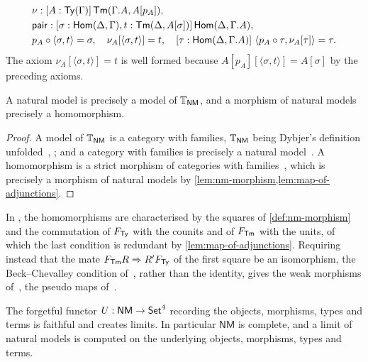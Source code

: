 \begin{definition}
\begin{align*}
        &\nu : [A : \mathsf{Ty}(\Gamma)]\,\mathsf{Tm}(\Gamma.A, A[p_A]),\\
        &\mathsf{pair} : [\sigma : \mathsf{Hom}(\Delta, \Gamma), t : \mathsf{Tm}(\Delta, A[\sigma])]\,\mathsf{Hom}(\Delta, \Gamma.A),\\
        &p_A \circ \langle \sigma, t \rangle = \sigma, \quad \nu_A[\langle \sigma, t \rangle] = t, \quad [\tau : \mathsf{Hom}(\Delta, \Gamma.A)]\ \langle p_A \circ \tau, \nu_A[\tau] \rangle = \tau.
    \end{align*}
    The axiom $\nu_A[\langle \sigma, t \rangle] = t$ is well formed because $A[p_A][\langle \sigma, t \rangle] = A[\sigma]$ by the preceding axioms.
\end{definition}

\begin{lemma}\label{lem:nm-models}
    A natural model is precisely a model of $\mathbb{T}_{\mathsf{NM}}$, and a morphism of natural models precisely a homomorphism.
\end{lemma}

\begin{proof}
    A model of $\mathbb{T}_{\mathsf{NM}}$ is a category with families, $\mathbb{T}_{\mathsf{NM}}$ being Dybjer's definition unfolded~\cite[\S2.2]{Dybjer1996}, \cite[Rem.~2]{CastellanClairambaultDybjer2021}; and a category with families is precisely a natural model~\cite[Prop.~2]{Awodey2018}. A homomorphism is a strict morphism of categories with families~\cite[Def.~2]{Dybjer1996}, which is precisely a morphism of natural models by \cref{lem:nm-morphism,lem:map-of-adjunctions}.
\end{proof}

In \cite[Thm.~2.3.2]{Newstead2018}, the homomorphisms are characterised by the squares of \cref{def:nm-morphism} and the commutation of $F_{\mathsf{Ty}}$ with the counits and of $F_{\mathsf{Tm}}$ with the units, of which the last condition is redundant by \cref{lem:map-of-adjunctions}. Requiring instead that the mate $F_{\mathsf{Tm}} R \Rightarrow R' F_{\mathsf{Ty}}$ of the first square be an isomorphism, the Beck--Chevalley condition of~\cite[Def.~3.14]{Uemura2023}, rather than the identity, gives the weak morphisms of~\cite[Def.~2.3.9]{Newstead2018}, the pseudo maps of~\cite[Def.~42]{AhrensLumsdaineNorth2024}.

\begin{lemma}\label{lem:limits}
    The forgetful functor $U : \mathsf{NM} \to \mathsf{Set}^4$ recording the objects, morphisms, types and terms is faithful and creates limits. In particular $\mathsf{NM}$ is complete, and a limit of natural models is computed on the underlying objects, morphisms, types and terms.
\end{lemma}

